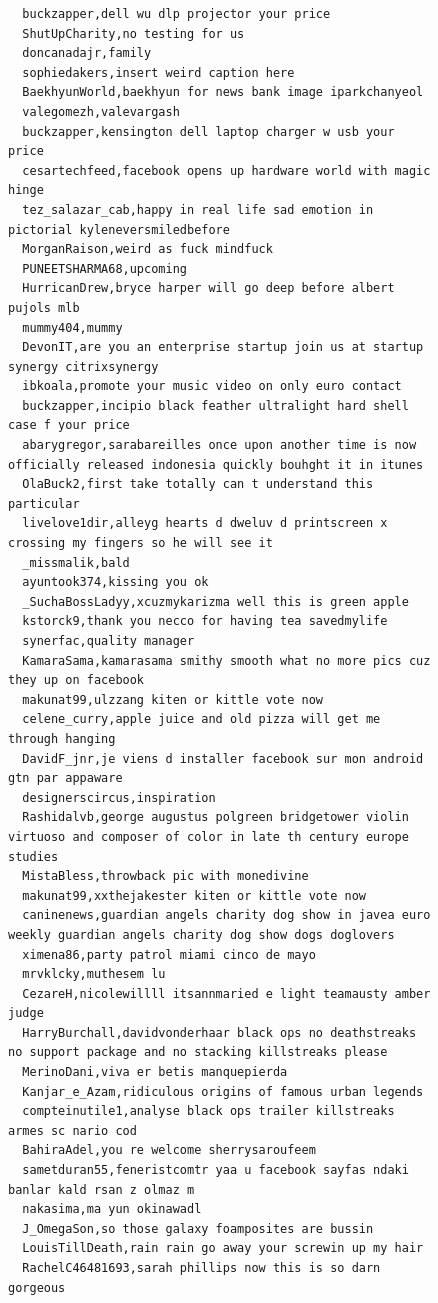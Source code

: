 \begin{figure}[htpb]
\begin{verbatim}
  buckzapper,dell wu dlp projector your price
  ShutUpCharity,no testing for us
  doncanadajr,family
  sophiedakers,insert weird caption here
  BaekhyunWorld,baekhyun for news bank image iparkchanyeol
  valegomezh,valevargash
  buckzapper,kensington dell laptop charger w usb your price
  cesartechfeed,facebook opens up hardware world with magic hinge
  tez_salazar_cab,happy in real life sad emotion in pictorial kyleneversmiledbefore
  MorganRaison,weird as fuck mindfuck
  PUNEETSHARMA68,upcoming
  HurricanDrew,bryce harper will go deep before albert pujols mlb
  mummy404,mummy
  DevonIT,are you an enterprise startup join us at startup synergy citrixsynergy
  ibkoala,promote your music video on only euro contact
  buckzapper,incipio black feather ultralight hard shell case f your price
  abarygregor,sarabareilles once upon another time is now officially released indonesia quickly bouhght it in itunes
  OlaBuck2,first take totally can t understand this particular
  livelove1dir,alleyg hearts d dweluv d printscreen x crossing my fingers so he will see it
  _missmalik,bald
  ayuntook374,kissing you ok
  _SuchaBossLadyy,xcuzmykarizma well this is green apple
  kstorck9,thank you necco for having tea savedmylife
  synerfac,quality manager
  KamaraSama,kamarasama smithy smooth what no more pics cuz they up on facebook
  makunat99,ulzzang kiten or kittle vote now
  celene_curry,apple juice and old pizza will get me through hanging
  DavidF_jnr,je viens d installer facebook sur mon android gtn par appaware
  designerscircus,inspiration
  Rashidalvb,george augustus polgreen bridgetower violin virtuoso and composer of color in late th century europe studies
  MistaBless,throwback pic with monedivine
  makunat99,xxthejakester kiten or kittle vote now
  caninenews,guardian angels charity dog show in javea euro weekly guardian angels charity dog show dogs doglovers
  ximena86,party patrol miami cinco de mayo
  mrvklcky,muthesem lu
  CezareH,nicolewillll itsannmaried e light teamausty amber judge
  HarryBurchall,davidvonderhaar black ops no deathstreaks no support package and no stacking killstreaks please
  MerinoDani,viva er betis manquepierda
  Kanjar_e_Azam,ridiculous origins of famous urban legends
  compteinutile1,analyse black ops trailer killstreaks armes sc nario cod
  BahiraAdel,you re welcome sherrysaroufeem
  sametduran55,feneristcomtr yaa u facebook sayfas ndaki banlar kald rsan z olmaz m
  nakasima,ma yun okinawadl
  J_OmegaSon,so those galaxy foamposites are bussin
  LouisTillDeath,rain rain go away your screwin up my hair
  RachelC46481693,sarah phillips now this is so darn gorgeous

\end{verbatim}
\end{figure}

